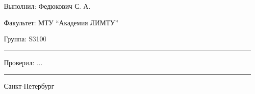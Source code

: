 \documentclass[12pt]{article}
\begin{document}
\begin{flushright}
\large
Выполнил: Федюкович С. А.
\par\bigskip
Факультет: МТУ “Академия ЛИМТУ”
\par\bigskip
Группа: S3100                       
\par\bigskip\par\bigskip\par\bigskip

\rule{150pt}{0.5pt}
\par\bigskip\par\bigskip\par\bigskip\par\bigskip                                                            
 Проверил: ...
\par\bigskip \par\bigskip

\rule{150pt}{0.5pt}
\end{flushright}
\par\bigskip\par\bigskip\par\bigskip\par\bigskip\par\bigskip\par\bigskip\par\bigskip\par\bigskip\par\bigskip\par\bigskip     
\begin{center}
\large
Санкт-Петербург
\par{}
\end{center}
\newpage
\end{document}
